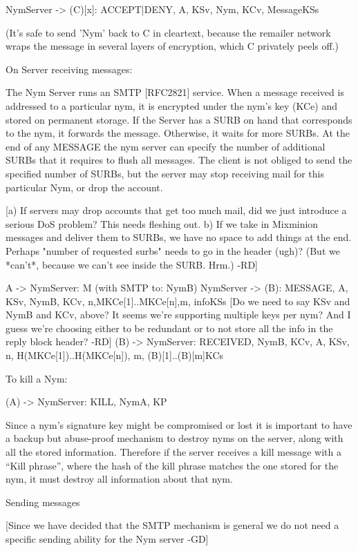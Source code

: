 NymServer -> (C)[x]: {ACCEPT|DENY, A, KSv, Nym, KCv, Message}KSs

(It's safe to send 'Nym' back to C in cleartext, because the remailer
network wraps the message in several layers of encryption, which C
privately peels off.)

On Server receiving messages:

The Nym Server runs an SMTP [RFC2821] service. When a message received
is addressed to a particular nym, it is encrypted under the nym's key
(KCe) and stored on permanent storage. If the Server has a SURB on
hand that corresponds to the nym, it forwards the message. Otherwise,
it waits for more SURBs. At the end of any MESSAGE the nym server can
specify the number of additional SURBs that it requires to flush all
messages. The client is not obliged to send the specified number of
SURBs, but the server may stop receiving mail for this particular Nym,
or drop the account.

[a) If servers may drop accounts that get too much mail, did we just
 introduce a serious DoS problem? This needs fleshing out.
 b) If we take in Mixminion messages and deliver them to SURBs, we have
 no space to add things at the end. Perhaps "number of requested surbs"
 needs to go in the header (ugh)? (But we *can't*, because we can't see
 inside the SURB. Hrm.) -RD]

A -> NymServer: M (with SMTP to: NymB)
NymServer -> (B): {MESSAGE, A, KSv, NymB, KCv,
                   n,{M}KCe[1]..{M}KCe[n],m, info}KSs
[Do we need to say KSv and NymB and KCv, above? It seems we're supporting
multiple keys per nym? And I guess we're choosing either to be redundant
or to not store all the info in the reply block header? -RD]
(B) -> NymServer: {RECEIVED,  NymB, KCv, A, KSv, n,
                   H({M}KCe[1])..H({M}KCe[n]), m, (B)[1]..(B)[m]}KCs

To kill a Nym:

(A) -> NymServer: {KILL, NymA, KP}

Since a nym's signature key might be compromised or lost it is
important to have a backup but abuse-proof mechanism to destroy nyms
on the server, along with all the stored information. Therefore if the
server receives a kill message with a ``Kill phrase'', where the hash
of the kill phrase matches the one stored for the nym, it must destroy
all information about that nym.

Sending messages

[Since we have decided that the SMTP mechanism is general we do not
  need a specific sending ability for the Nym server -GD]

